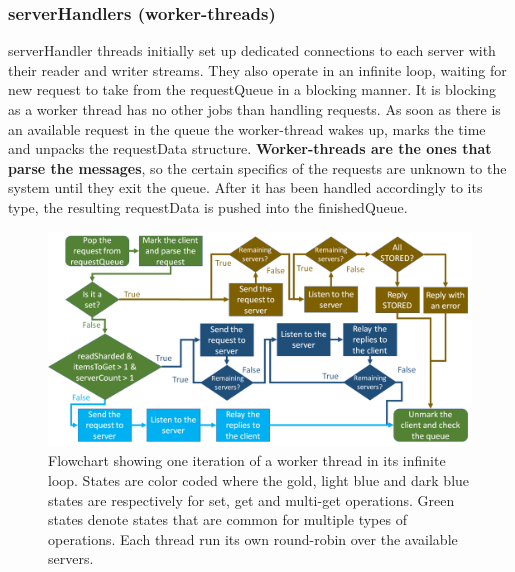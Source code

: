 \documentclass[11pt,a4paper]{article}
\begin{document}
\subsubsection{serverHandlers (worker-threads)} \label{sec:ov-workerthread}
serverHandler threads initially set up dedicated connections to each server with their reader and writer streams. They also operate in an infinite loop, waiting for new request to take from the requestQueue in a blocking manner. It is blocking as a worker thread has no other jobs than handling requests. As soon as there is an available request in the queue the worker-thread wakes up, marks the time and unpacks the requestData structure. \textbf{Worker-threads are the ones that parse the messages}, so the certain specifics of the requests are unknown to the system until they exit the queue. After it has been handled accordingly to its type, the resulting requestData is pushed into the finishedQueue.
\begin{figure}[h]
  \centering
  \includegraphics[width=1.0\linewidth,trim={0px 0px 0px 0px},clip]{img/flowchart.png}
  \caption{Flowchart showing one iteration of a worker thread in its infinite loop. States are color coded where the gold, light blue and dark blue states are respectively for set, get and multi-get operations. Green states denote states that are common for multiple types of operations. Each thread run its own round-robin over the available servers.}
  \label{fig:flowchart}
\end{figure}
\end{document}
